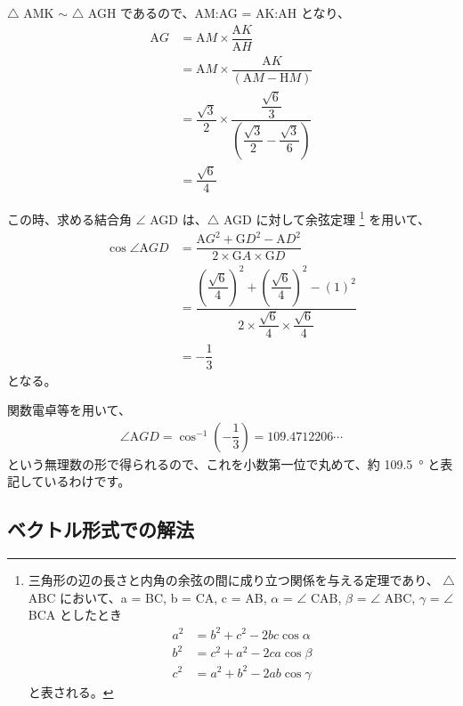 \documentclass[a4paper,11pt]{jlreq}
\begin{document}
$\bigtriangleup$ AMK $\sim$ $\bigtriangleup$ AGH であるので、AM:AG = AK:AH となり、
\begin{align*}
{\mathrm AG} 
	&= { {\mathrm AM} } \times \dfrac{ {\mathrm AK} }{ {\mathrm AH} } \\
	&= { {\mathrm AM} } \times \dfrac{ {\mathrm AK} }{ ({\mathrm AM} - {\mathrm HM}) } \\
	&= \dfrac{\sqrt{3}}{2} \times \dfrac{ \dfrac{\sqrt{6}}{3} }{ \left( \dfrac{\sqrt{3}}{2} - \dfrac{\sqrt{3}}{6} \right) } \\
	&= \dfrac{ \sqrt{6} }{ 4 }
\end{align*}

この時、求める結合角 $\angle$ AGD は、$\bigtriangleup$ AGD に対して余弦定理
\footnote{
    三角形の辺の長さと内角の余弦の間に成り立つ関係を与える定理であり、
    $\bigtriangleup$ ABC において、a = BC, b = CA, c = AB, $\alpha$ = $\angle$ CAB, $\beta$ = $\angle$ ABC, $\gamma$ = $\angle$ BCA としたとき
    \begin{align*}
    a^2 &= b^2 + c^2 − 2 bc \cos \alpha \\
    b^2 &= c^2 + a^2 − 2 ca \cos \beta \\
    c^2 &= a^2 + b^2 − 2 ab \cos \gamma
    \end{align*}
    と表される。
    }
を用いて、
\begin{align*}
\cos \angle {\mathrm AGD} 
	&= \dfrac{ {\mathrm AG}^2 + {\mathrm GD}^2 - {\mathrm AD}^2 }{ 2 \times {\mathrm GA} \times {\mathrm GD} } \\
	&= \dfrac{ \left( \dfrac{ \sqrt{6} }{ 4 } \right)^2 + \left( \dfrac{ \sqrt{6} }{ 4 } \right)^2 - \left( 1 \right)^2 }{ 2 \times \dfrac{ \sqrt{6} }{ 4 } \times \dfrac{ \sqrt{6} }{ 4 } } \\
	&= -\dfrac{ 1 }{ 3 }
\end{align*}
となる。

関数電卓等を用いて、
\begin{align*}
\angle {\mathrm AGD} = \cos ^{-1} \left( -\dfrac{1}{3} \right) = 109.4712206 \cdots
\end{align*}
という無理数の形で得られるので、これを小数第一位で丸めて、約 \qty{109.5}{\degree} と表記しているわけです。

\subsection{ベクトル形式での解法}
\end{document}
